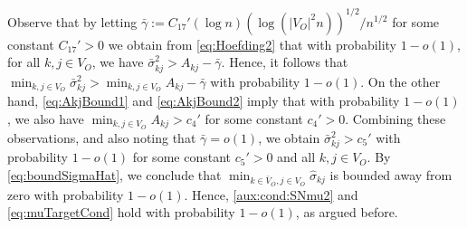 \documentclass[opre,nonblindrev]{informs3} %
\begin{document}
\begin{APPENDIX}{}
  Observe that by letting
$\bar{\gamma}  :=
  C_{17}'(\log n)(\log(|V_O|^2n))^{1/2}/n^{1/2}
  $ for some constant $C_{17}'>0$ we obtain from \eqref{eq:Hoefding2} that
  with probability $1-o(1)$, for all $k,j\in V_O$, we have
$ \bar\sigma_{kj}^2 > A_{kj} - \bar{\gamma}$. 
Hence, it follows that
$\min_{k,j\in V_O} \bar\sigma_{kj}^2 > \min_{k,j\in V_O} A_{kj} - \bar{\gamma}$
with probability $1-o(1)$.
On the other hand,
  \eqref{eq:AkjBound1} and \eqref{eq:AkjBound2} imply that
  with probability
  $1-o(1)$, we also have 
  $\min_{k,j\in V_O} A_{kj} >c_4'$ for some constant $c_4'>0$.
  Combining these observations, and also noting that
  $\bar{\gamma}=o(1)$, we obtain
  $ \bar\sigma_{kj}^2 >c_5'$ with probability $1-o(1)$ for some constant $c_5'>0$ and all $k,j\in V_O$.
  By \eqref{eq:boundSigmaHat}, we conclude that 
  $\min_{k\in \bar V_O, j\in V_O} \hat\sigma_{kj}$ is bounded away from zero with probability $1-o(1)$.
  Hence, 
  \eqref{aux:cond:SNmu2} and \eqref{eq:muTargetCond} hold with probability $1-o(1)$, as argued before.
  

\end{APPENDIX}
\end{document}
